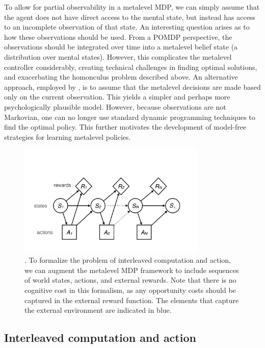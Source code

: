 To allow for partial observability in a metalevel MDP, we can simply assume that the agent does not have direct access to the mental state, but instead has access to an incomplete observation of that state. An interesting question arises as to how these observations should be used. From a POMDP perspective, the observations should be integrated over time into a metalevel belief state (a distribution over mental states). However, this complicates the metalevel controller considerably, creating technical challenges in finding optimal solutions, and exacerbating the homonculus problem described above. An alternative approach, employed by \citet{suchow2016deciding}, is to assume that the metalevel decisions are made based only on the current observation. This yields a simpler and perhaps more psychologically plausible model. However, because observations are not Markovian, one can no longer use standard dynamic programming techniques to find the optimal policy. This further motivates the development of model-free strategies for learning metalevel policies.

\begin{figure}
  \centering
  \includegraphics[width=0.8\textwidth,page=3,trim=0 50 0 50]{diagrams/metamdp.pdf}
  \caption{. To formalize the problem of interleaved computation and action, we can augment the metalevel MDP framework to include sequences of world states, actions, and external rewards. Note that there is no cognitive cost in this formalism, as any opportunity costs should be captured in the external reward function. The elements that capture the external environment are indicated in blue.
  }
  \label{fig:metamdp-joint}
\end{figure}

\subsection{Interleaved computation and action}\label{sec:interleaved}

